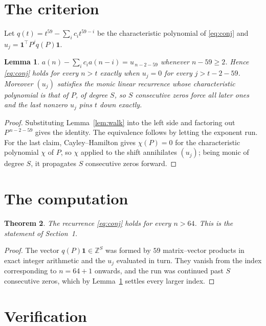 \documentclass[11pt,a4paper]{article}
\theoremstyle{plain}
\newtheorem{theorem}{Theorem}
\newtheorem{lemma}[theorem]{Lemma}
\theoremstyle{definition}
\begin{document}
\section{The criterion}

Let $q(t)=t^{59}-\sum_i c_i t^{59-i}$ be the characteristic polynomial of
\eqref{eq:conj} and $u_j=\mathbf{1}^{\!\top}P^{j}q(P)\mathbf{1}$.

\begin{lemma}\label{lem:crit}
$a(n)-\sum_i c_i a(n-i)=u_{\,n-2-59}$ whenever $n-59\ge2$. Hence
\eqref{eq:conj} holds for every $n>t$ exactly when $u_j=0$ for every
$j>t-2-59$. Moreover $(u_j)$ satisfies the monic linear recurrence whose
characteristic polynomial is that of $P$, of degree $S$, so $S$ consecutive zeros force all
later ones and the last nonzero $u_j$ pins $t$ down exactly.
\end{lemma}

\begin{proof}
Substituting Lemma~\ref{lem:walk} into the left side and factoring out
$P^{\,n-2-59}$ gives the identity. The equivalence follows by letting the exponent
run. For the last claim, Cayley--Hamilton gives $\chi(P)=0$ for the characteristic
polynomial $\chi$ of $P$, so $\chi$ applied to the shift annihilates $(u_j)$; being monic of
degree $S$, it propagates $S$ consecutive zeros forward.
\end{proof}

\section{The computation}

\begin{theorem}
The recurrence \eqref{eq:conj} holds for every $n>64$. This is the statement of
Section~1.
\end{theorem}

\begin{proof}
The vector $q(P)\mathbf{1}\in\mathbb{Z}^{S}$ was formed by $59$ matrix--vector
products in exact integer arithmetic and the $u_j$ evaluated in turn. They vanish from the
index corresponding to $n=64+1$ onwards, and the run was continued past $S$ consecutive
zeros, which by Lemma~\ref{lem:crit} settles every larger index.
\end{proof}

\section{Verification}
\end{document}
